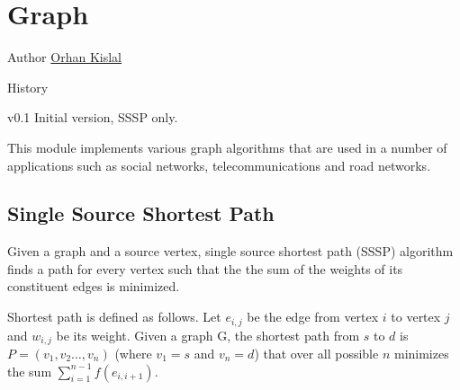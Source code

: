 
\chapter[Graph]{Graph}

\begin{moduleinfo}
\item[Author] \href{mailto:okislal@pivotal.io}{Orhan Kislal}
\item[History]
	\begin{modulehistory}
		\item[v0.1] Initial version, SSSP only.
	\end{modulehistory}
\end{moduleinfo}



This module implements various graph algorithms that are used in a number of applications such as social networks, telecommunications and road networks.



\section{Single Source Shortest Path} \label{sec:graph:sssp}

Given a graph and a source vertex, single source shortest path (SSSP) algorithm finds a path for every vertex such that the the sum of the weights of its constituent edges is minimized.

Shortest path is defined as follows. Let $e_{i,j}$ be the edge from vertex $i$ to vertex $j$ and $w_{i,j}$ be its weight. Given a graph G, the shortest path from $s$ to $d$ is $P = (v_1, v_2 \dots, v_n)$ (where $v_1=s$ and $v_n=d$) that over all possible $n$ minimizes the sum $ \sum _{i=1}^{n-1}f(e_{i,i+1})$.


